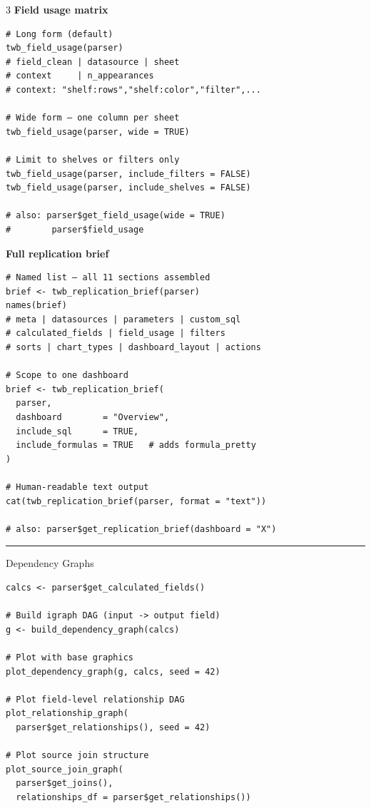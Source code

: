 \documentclass[10pt,landscape]{article}
\newcommand{\sep}{\vspace{1pt}\hrule\vspace{2pt}}
\begin{document}
\begin{multicols}{3}
\textbf{Field usage matrix}

\begin{lstlisting}
# Long form (default)
twb_field_usage(parser)
# field_clean | datasource | sheet
# context     | n_appearances
# context: "shelf:rows","shelf:color","filter",...

# Wide form — one column per sheet
twb_field_usage(parser, wide = TRUE)

# Limit to shelves or filters only
twb_field_usage(parser, include_filters = FALSE)
twb_field_usage(parser, include_shelves = FALSE)

# also: parser$get_field_usage(wide = TRUE)
#        parser$field_usage
\end{lstlisting}

\textbf{Full replication brief}

\begin{lstlisting}
# Named list — all 11 sections assembled
brief <- twb_replication_brief(parser)
names(brief)
# meta | datasources | parameters | custom_sql
# calculated_fields | field_usage | filters
# sorts | chart_types | dashboard_layout | actions

# Scope to one dashboard
brief <- twb_replication_brief(
  parser,
  dashboard        = "Overview",
  include_sql      = TRUE,
  include_formulas = TRUE   # adds formula_pretty
)

# Human-readable text output
cat(twb_replication_brief(parser, format = "text"))

# also: parser$get_replication_brief(dashboard = "X")
\end{lstlisting}

\sep

\begin{secbox}[twbGreen]{Dependency Graphs}
\end{secbox}

\begin{lstlisting}
calcs <- parser$get_calculated_fields()

# Build igraph DAG (input -> output field)
g <- build_dependency_graph(calcs)

# Plot with base graphics
plot_dependency_graph(g, calcs, seed = 42)

# Plot field-level relationship DAG
plot_relationship_graph(
  parser$get_relationships(), seed = 42)

# Plot source join structure
plot_source_join_graph(
  parser$get_joins(),
  relationships_df = parser$get_relationships())
\end{lstlisting}


\end{multicols}
\end{document}
